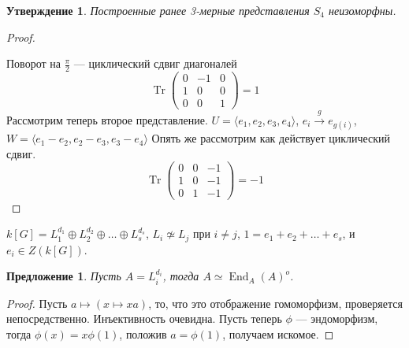 \documentclass{article}
\newtheorem*{statement}{Утверждение}
\newtheorem*{proposition}{Предложение}
\theoremstyle{definition}
\theoremstyle{remark}
\DeclareMathOperator{\End}{End}
\DeclareMathOperator{\Tr}{Tr}
\begin{document}
\begin{statement}
Построенные ранее 3-мерные представления $S_4$ неизоморфны.
\end{statement}
\begin{proof} \quad

\begin{center}
\end{center}

Поворот на $\frac \pi 2$ --- циклический сдвиг диагоналей
\begin{equation*}
\Tr
\begin{pmatrix}
0 & -1 & 0 \\
1 & 0 & 0 \\
0 & 0 & 1
\end{pmatrix}
= 1
\end{equation*}
Рассмотрим теперь второе представление.
$U = \langle e_1, e_2, e_3, e_4\rangle$, $e_i \xrightarrow{g} e_{g(i)}$, $W = \langle e_1 - e_2, e_2 - e_3, e_3 - e_4 \rangle$
Опять же рассмотрим как действует циклический сдвиг.
\begin{equation*}
\Tr
\begin{pmatrix}
0 & 0 & -1 \\
1 & 0 & - 1 \\
0 & 1 & -1
\end{pmatrix}
= -1
\end{equation*}
\end{proof}

$k[G] = L_1^{d_1} \oplus L_2^{d_2} \oplus \ldots \oplus L_s^{d_s}$, $L_i \not\simeq L_j$ при $i \neq j$, $1 = e_1 + e_2 + \ldots + e_s$, и $e_i \in Z(k[G]).$
\begin{proposition}
Пусть $A = L_i^{d_i}$, тогда $A \simeq \End_A(A)^o$. %
\end{proposition}
\begin{proof}
Пусть $a \mapsto (x \mapsto xa)$, то, что это отображение гомоморфизм, проверяется непосредственно. Инъективность очевидна. Пусть теперь $\phi$ --- эндоморфизм, тогда $\phi(x) = x\phi(1)$, положив $a = \phi(1)$, получаем искомое.
\end{proof}
\end{document}
